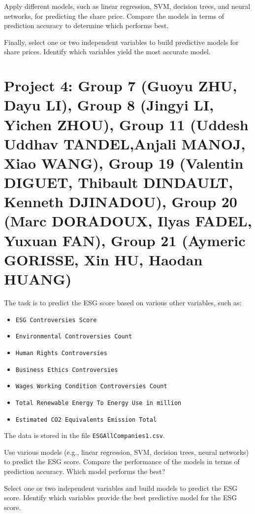 \documentclass{article}
\begin{document}
Apply different models, such as linear regression, SVM, decision trees, and neural networks, for predicting the share price. Compare the models in terms of prediction accuracy to determine which performs best.

Finally, select one or two independent variables to build predictive models for share prices. Identify which variables yield the most accurate model. 



 \section*{Project 4:  Group 7 (Guoyu ZHU, Dayu LI), Group 8 (Jingyi LI, Yichen ZHOU), Group 11 (Uddesh Uddhav	TANDEL,Anjali	MANOJ, Xiao WANG),
  Group 19 (Valentin	DIGUET, Thibault DINDAULT, Kenneth DJINADOU),
  Group 20 (Marc DORADOUX, Ilyas FADEL, Yuxuan	FAN), Group 21 (Aymeric	GORISSE, Xin HU, Haodan	HUANG)
 }
The task is to predict the ESG score based on various other variables, such as: \begin{itemize} \item \lstinline$ESG Controversies Score$ \item \lstinline$Environmental Controversies Count$ \item \lstinline$Human Rights Controversies$ \item \lstinline$Business Ethics Controversies$ \item \lstinline$Wages Working Condition Controversies Count$ \item \lstinline$Total Renewable Energy To Energy Use in million$ \item \lstinline$Estimated CO2 Equivalents Emission Total$ \end{itemize}

The data is stored in the file \lstinline$ESGAllCompanies1.csv$.

Use various models (e.g., linear regression, SVM, decision trees, neural networks) to predict the ESG score. Compare the performance of the models in terms of prediction accuracy. Which model performs the best?

Select one or two independent variables and build models to predict the ESG score. Identify which variables provide the best predictive model for the ESG score. 
\end{document}
